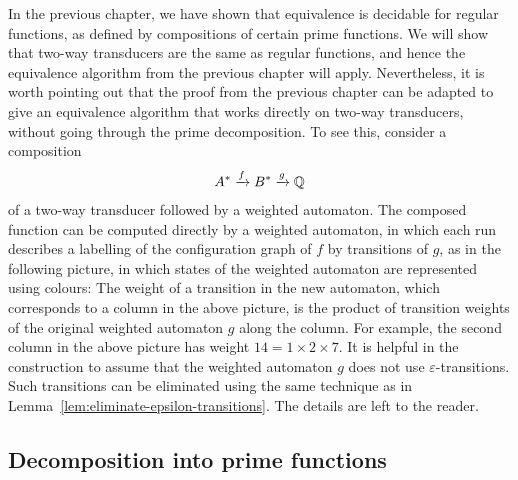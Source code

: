 In the previous chapter, we have shown that equivalence is decidable for regular functions, as defined by compositions of certain prime functions. We will show that two-way transducers are the same as regular functions, and hence the equivalence algorithm from the previous chapter will apply. Nevertheless, it is worth pointing out that the proof from the previous chapter can be adapted to give an equivalence algorithm that works directly on two-way transducers, without going through the prime decomposition. To see this, consider a composition 
\begin{align*}
A^* \xrightarrow f B^* \xrightarrow g {\mathbb Q}
\end{align*}
of a two-way transducer followed by a weighted automaton. The composed function can be computed directly by a weighted automaton, in which each run describes a labelling of the configuration graph of $f$ by transitions of $g$, as in the following picture, in which states of the weighted automaton are represented using colours:
The weight of a transition in the new automaton, which corresponds to a column in the above picture, is the product of transition weights of the original weighted automaton $g$ along the column. For example, the second column in the above picture has weight $14 = 1 \times 2 \times 7$. It is helpful in the construction to assume that the weighted automaton $g$ does not use $\varepsilon$-transitions. Such transitions can be eliminated using the same technique as in Lemma~\ref{lem:eliminate-epsilon-transitions}. The details are left to the reader. 


\subsection{Decomposition into prime functions}
\label{sec:decomposition-2dfa-into-primes}

